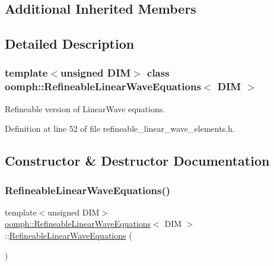 \subsection*{Additional Inherited Members}


\subsection{Detailed Description}
\subsubsection*{template$<$unsigned D\+IM$>$\newline
class oomph\+::\+Refineable\+Linear\+Wave\+Equations$<$ D\+I\+M $>$}

Refineable version of Linear\+Wave equations. 

Definition at line 52 of file refineable\+\_\+linear\+\_\+wave\+\_\+elements.\+h.



\subsection{Constructor \& Destructor Documentation}
\mbox{\label{classoomph_1_1RefineableLinearWaveEquations_a40fca9fa73b5e7f2cdbd4725a41777f2}} 
\subsubsection{\texorpdfstring{Refineable\+Linear\+Wave\+Equations()}{RefineableLinearWaveEquations()}\hspace{0.1cm}{\footnotesize\ttfamily [1/2]}}
{\footnotesize\ttfamily template$<$unsigned D\+IM$>$ \\
\hyperlink{classoomph_1_1RefineableLinearWaveEquations}{oomph\+::\+Refineable\+Linear\+Wave\+Equations}$<$ D\+IM $>$\+::\hyperlink{classoomph_1_1RefineableLinearWaveEquations}{Refineable\+Linear\+Wave\+Equations} (\begin{DoxyParamCaption}{ }\end{DoxyParamCaption})\hspace{0.3cm}{\ttfamily [inline]}}



